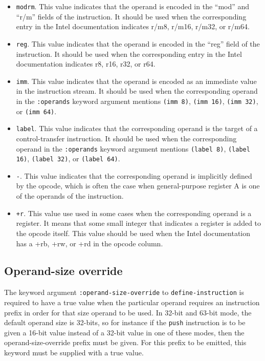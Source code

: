 \begin{itemize}
\item \texttt{modrm}.  This value indicates that the operand is encoded in the
  ``mod'' and ``r/m'' fields of the instruction.  It should be used
  when the corresponding entry in the Intel documentation indicates
  r/m8, r/m16, r/m32, or r/m64.
\item \texttt{reg}.  This value indicates that the operand is encoded
  in the ``reg'' field of the instruction.  It should be used when the
  corresponding entry in the Intel documentation indicates r8, r16,
  r32, or r64.
\item \texttt{imm}.  This value indicates that the operand is encoded
  as an immediate value in the instruction stream.  It should be used
  when the corresponding operand in the \texttt{:operands} keyword
  argument mentions \texttt{(imm 8)}, \texttt{(imm 16)}, \texttt{(imm
    32)}, or \texttt{(imm 64)}.
\item \texttt{label}.  This value indicates that the corresponding
  operand is the target of a control-transfer instruction.  It should
  be used when the corresponding operand in the \texttt{:operands}
  keyword argument mentions \texttt{(label 8)}, \texttt{(label 16)},
  \texttt{(label 32)}, or \texttt{(label 64)}.
\item \texttt{-}.  This value indicates that the corresponding operand
  is implicitly defined by the opcode, which is often the case when
  general-purpose register A is one of the operands of the
  instruction.
\item \texttt{+r}.  This value use used in some cases when the
  corresponding operand is a register.  It means that some small
  integer that indicates a register is added to the opcode itself.
  This value should be used when the Intel documentation has a +rb,
  +rw, or +rd in the opcode column.
\end{itemize}

\subsection{Operand-size override}

The keyword argument \texttt{:operand-size-override} to
\texttt{define-instruction} is required to have a true value when the
particular operand requires an instruction prefix in order for that
size operand to be used.  In 32-bit and 63-bit mode, the default
operand size is 32-bits, so for instance if the \texttt{push}
instruction is to be given a 16-bit value instead of a 32-bit value in
one of these modes, then the operand-size-override prefix must be
given.  For this prefix to be emitted, this keyword must be supplied
with a true value.

